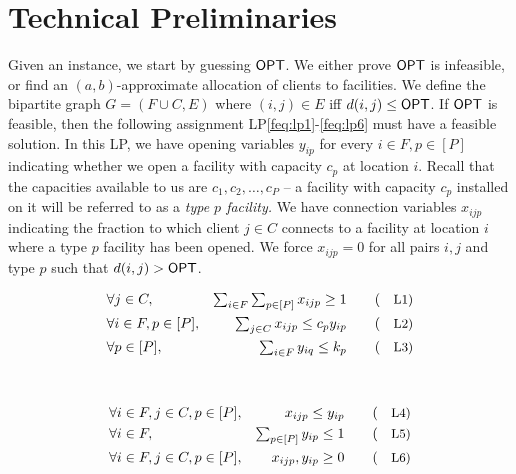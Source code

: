 \section{Technical Preliminaries}\label{fsec:prelims}
Given an \mckc instance, we start by guessing $\mathsf{OPT}$. We either prove $\mathsf{OPT}$ is infeasible, or find an $(a,b)$-approximate allocation of clients to facilities.
	We define the bipartite graph $G = (F\cup C,E)$ where $(i,j)\in E$ iff $d(i,j) \leq \mathsf{OPT}$. If $\mathsf{OPT}$ is feasible, then the following assignment LP\eqref{feq:lp1}-\eqref{feq:lp6}
	must have a feasible solution.
In this LP, we  have opening  variables $y_{ip}$ for every $i\in F,p\in [P]$ indicating whether we open a facility with capacity $c_p$ at location $i$. Recall that the capacities available to us are $c_1, c_2, \ldots, c_P$ -- a facility with
capacity $c_p$ installed on it will be referred to as a {\em type $p$ facility.}
	We have connection variables $x_{ijp}$ indicating the fraction to which client $j\in C$ connects to a facility at location $i$ where a type $p$ facility has been opened.
	We force $x_{ijp} = 0$ for all pairs $i,j$ and type $p$ such that  $d(i,j) > \mathsf{OPT}$.
	
		
		\begin{minipage}{0.49\textwidth}
			\begin{alignat}{3}
				& \forall j\in C,   &\textstyle \sum_{i\in F} \sum_{p\in [P]}  x_{ijp} \geq 1 \label{feq:lp1} \tag{\small{L1}}  \\
				& \forall i\in F,p\in [P] ,  &\textstyle \sum_{j\in C}  x_{ijp} \leq c_py_{ip} \label{feq:lp2} \tag{\small{L2}} \\
				& \forall p\in [P], & \textstyle \sum_{i\in F} y_{iq}   \leq k_p \label{feq:lp3}  \tag{\small{L3}}
			\end{alignat}
		\end{minipage}
		~\vline~
		\begin{minipage}{0.49\textwidth}
			\begin{alignat}{3}
				& \forall i\in F, j\in C,p\in [P],  &  x_{ijp} \leq y_{ip}\label{feq:lp4}   \tag{\small{L4}} \\
				& \forall i\in F, &  \textstyle\sum_{p\in [P]} y_{ip} \leq 1 \label{feq:lp5}  \tag{\small{L5}} \\
				& \forall i\in F,j\in C,p\in [P], &  x_{ijp},y_{ip} \geq 0\label{feq:lp6}\tag{\small{L6}}
			\end{alignat}
		\end{minipage}
\smallskip

